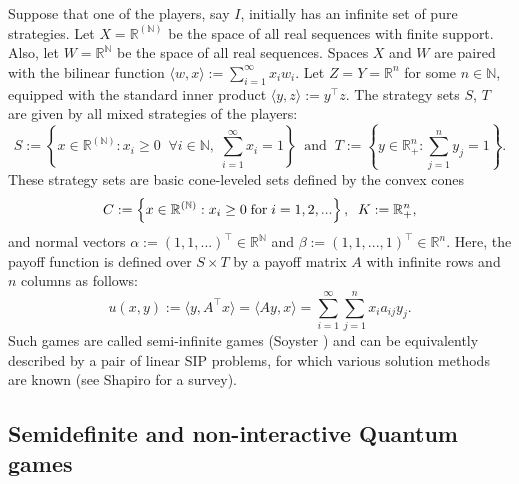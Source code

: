 \documentclass[11pt, twoside]{article}
\numberwithin{equation}{section}
\theoremstyle{definition}
\begin{document}
 Suppose that one of the players, say $I$, initially has an infinite set of pure strategies. Let $X=\mathbb{R}^{(\mathbb{N})}$ be the space of all real sequences with finite support. Also, let $W=\mathbb{R}^{\mathbb{N}}$ be the space of all real sequences. Spaces $X$ and $W$ are paired with the bilinear function $\langle w,x\rangle:= \sum_{i=1}^{\infty}x_iw_i$. Let $Z=Y=\mathbb{R}^{n}$ for some $n\in\mathbb{N}$, equipped with the standard inner product $\langle y,z\rangle:= y^{\top}z$. The strategy sets $S$, $T$ are given by all mixed strategies of the players:
\begin{equation*}
    S:= \left\{x\in\mathbb{R}^{(\mathbb{N})}:x_i\geq0\;\;\forall i\in\mathbb{N},\;\sum_{i=1}^{\infty}x_i=1\right\}\;\;\text{and}\;\;T:= \left\{y\in\mathbb{R}^{n}_{+}:\sum_{j=1}^{n}y_j=1\right\}.
\end{equation*}
These strategy sets are basic cone-leveled sets defined by the convex cones
\begin{equation*}
    C:= \left\{x\in\mathbb{R}^{(\mathbb{N})}:x_i\geq0\;\mbox{for\;}i=1,2,...\right\},\;\;K:=\mathbb{R}^{n}_{+},
\end{equation*}
and normal vectors $\alpha:= (1,1,...)^\top\in\mathbb{R}^{\mathbb{N}}$ and $\beta:= (1,1,...,1)^\top\in\mathbb{R}^n$.
Here, the payoff function is defined over $S\times T$ by a payoff matrix $A$ with infinite rows and $n$ columns as follows:
\begin{equation*}
    u(x,y):= \langle y, A^{\top}x\rangle=\langle Ay,x\rangle=\sum_{i=1}^{\infty}\sum_{j=1}^{n}x_ia_{ij}y_j.
\end{equation*}
Such games are called semi-infinite games (Soyster \cite{soyster1975semi}) and can be equivalently described by a pair of linear SIP problems, for which various solution methods are known (see Shapiro \cite{shapiro2009semi} for a survey).

\vspace{-0.1cm}\subsection{Semidefinite and non-interactive Quantum games} \vspace{-0.2cm}
\end{document}
